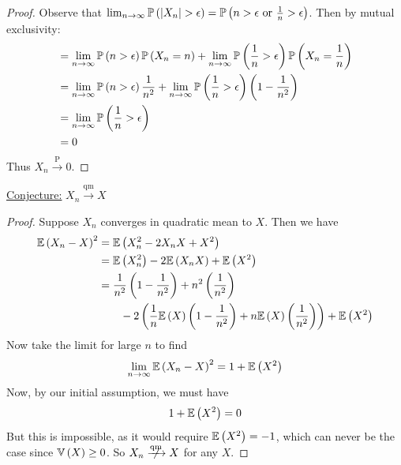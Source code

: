 \documentclass[a4paper]{article}
\begin{document}
\begin{proof}[Proof] 
Observe that \(\lim_{n \to \infty} \Prob\left( \abs{X_{n}} > \epsilon  \right) = \Prob\left( n > \epsilon \text{ or } \frac{1}{n} > \epsilon  \right)\). Then by mutual exclusivity:
\begin{align*}
	 & = \lim_{n \to \infty} \mathbb{P}\left( n > \epsilon  \right)\mathbb{P}\left( X_{n} = n \right) + \lim_{n \to \infty} \mathbb{P}\left( \frac{1}{n} > \epsilon  \right) \mathbb{P}\left( X_{n} = \frac{1}{n} \right) \\
	 & = \lim_{n \to \infty} \mathbb{P}\left( n > \epsilon  \right) \frac{1}{n^{2}} + \lim_{n \to \infty} \mathbb{P}\left( \frac{1}{n} > \epsilon  \right) \left( 1 - \frac{1}{n^{2}} \right)  \\ 
	 & = \lim_{n \to \infty} \mathbb{P}\left( \frac{1}{n} > \epsilon  \right) \\
	 & = 0
\end{align*}
Thus \(X_{n} \xrightarrow{\text{ P }} 0\).
\end{proof}

\underline{Conjecture:} \(X_{n} \xrightarrow{\text{qm}} X\)

\begin{proof}[Proof] 
Suppose \(X_{n}\) converges in quadratic mean to \(X\). Then we have
\begin{align*}
	\mathbb{E}\left( X_{n} - X \right)^{2} & = \mathbb{E}\left( X^{2}_{n} - 2X_{n}X + X^{2} \right) \\
	 & = \mathbb{E}\left( X^{2}_{n} \right) - 2 \mathbb{E}\left( X_{n}X \right) + \mathbb{E}\left( X^{2} \right) \\
	 & = \frac{1}{n^{2}} \left( 1 - \frac{1}{n^{2}} \right) + n^{2} \left( \frac{1}{n^{2}} \right) \\
	 & \qquad - 2 \left( \frac{1}{n} \mathbb{E}\left( X \right) \left( 1 - \frac{1}{n^{2}} \right) + n \mathbb{E}\left( X \right) \left( \frac{1}{n^{2}} \right)  \right) + \mathbb{E}\left( X^{2} \right) \\
\end{align*}
Now take the limit for large \(n\) to find
\[
	\lim_{n \to \infty} \mathbb{E}\left( X_{n} - X \right)^{2} = 1 + \mathbb{E}\left( X^{2} \right)
\]
Now, by our initial assumption, we must have
\[
	1 + \mathbb{E}\left( X^{2} \right) = 0
\]
But this is impossible, as it would require \(\mathbb{E}\left( X^{2} \right) = -1\), which can never be the case since \(\mathbb{V}\left( X \right) \ge 0\). So \(X_{n} \centernot{\xrightarrow{\text{qm}}} X\) for any \(X\).
\end{proof}
\end{document}
